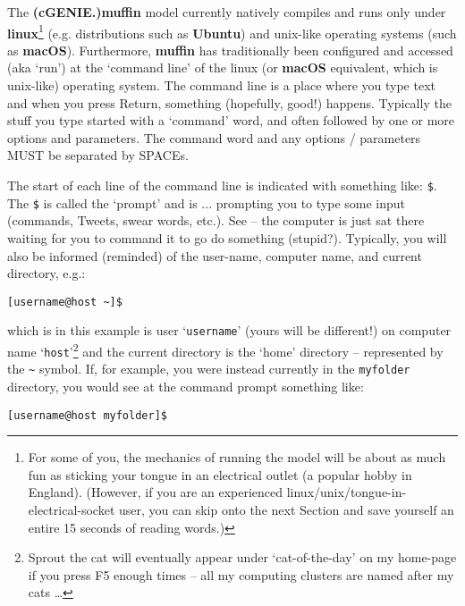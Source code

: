 \documentclass[11pt,fleqn]{book} %
\begin{document}
The \textbf{(cGENIE.)muffin} model currently natively compiles and runs only under \textbf{linux}\footnote{For some of you, the mechanics of running the model will be about as much fun as sticking your tongue in an electrical outlet (a popular hobby in England). (However, if you are an experienced linux/unix/tongue-in-electrical-socket user, you can skip onto the next Section and save yourself an entire 15 seconds of reading words.)} (e.g. distributions such as \textbf{Ubuntu}) and unix-like operating systems (such as \textbf{macOS}). Furthermore, \textbf{muffin} has traditionally been configured and accessed (aka ‘run') at the ‘command line’ of the linux (or \textbf{macOS} equivalent, which is unix-like) operating system. The command line is a place where you type text and when you press \small\textsf{Return}\normalsize, something (hopefully, good!) happens. Typically the stuff you type started with a ‘command’ word, and often followed by one or more options and parameters. The command word and any options / parameters MUST be separated by SPACEs.

The start of each line of the command line is indicated with something like: \texttt{\$}. The \texttt{\$} is called the ‘prompt’ and is ... prompting you to type some input (commands, Tweets, swear words, etc.). See – the computer is just sat there waiting for you to command it to go do something (stupid?). Typically, you will also be informed (reminded) of the user-name, computer name, and current directory, e.g.:

\vspace{-2mm}
\begin{verbatim}
[username@host ~]$
\end{verbatim}
\vspace{-2mm}

\noindent which is in this example is user ‘\texttt{username}’ (yours will be different!) on computer name ‘\texttt{host}’\footnote{Sprout the cat will eventually appear under ‘cat-of-the-day’ on my home-page if you press \textsf{F5} enough times – all my computing clusters are named after my cats …} and the current directory is the ‘home’ directory -- represented by the \texttt{\~} symbol. If, for example, you were instead currently in the \texttt{myfolder} directory, you would see at the command prompt something like:

\vspace{-2mm}
\begin{verbatim}
[username@host myfolder]$
\end{verbatim}
\vspace{-2mm}
\end{document}
